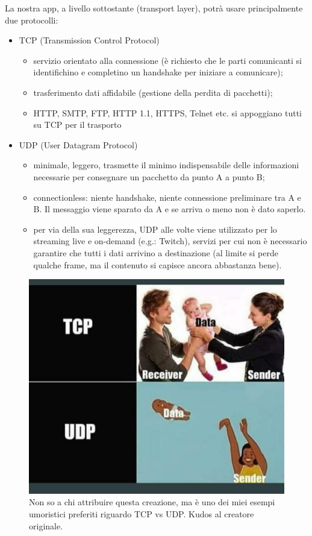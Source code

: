 \noindent La nostra app, a livello sottostante (transport layer), potrà usare principalmente due protocolli:
\begin{itemize}
    \item TCP (Transmission Control Protocol)
    \begin{itemize}
        \item servizio orientato alla connessione (è richiesto che le parti comunicanti si identifichino e completino un handshake per iniziare a comunicare);
        \item trasferimento dati affidabile (gestione della perdita di pacchetti);
        \item HTTP, SMTP, FTP, HTTP 1.1, HTTPS, Telnet etc. si appoggiano tutti su TCP per il trasporto
    \end{itemize}
    \item UDP (User Datagram Protocol)
    \begin{itemize}
        \item minimale, leggero, trasmette il minimo indispensabile delle informazioni necessarie per consegnare un pacchetto da punto A a punto B;
        \item connectionless: niente handshake, niente connessione preliminare tra A e B. Il messaggio viene sparato da A e se arriva o meno non è dato saperlo.
        \item per via della sua leggerezza, UDP alle volte viene utilizzato per lo streaming live e on-demand (e.g.: Twitch),  servizi per cui non è necessario garantire che tutti i dati arrivino a destinazione (al limite si perde qualche frame, ma il contenuto si capisce ancora abbastanza bene). 
    \end{itemize}
\end{itemize}

\begin{figure}[h]
    \centering
    \includegraphics[width=0.5\linewidth]{Figures/02/tcp-udp.png}
    \caption{Non so a chi attribuire questa creazione, ma è uno dei miei esempi umoristici preferiti riguardo TCP vs UDP. Kudos al creatore originale.}
\end{figure}

